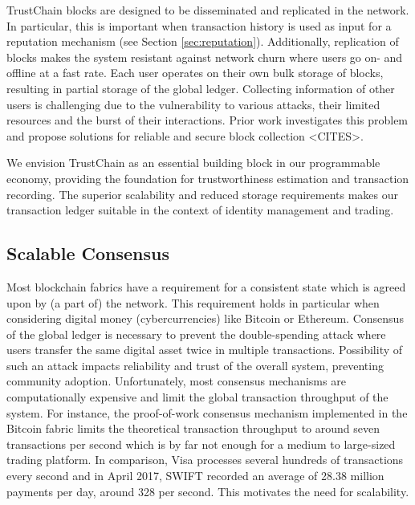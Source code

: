 \documentclass[USenglish]{article}
\begin{document}
TrustChain blocks are designed to be disseminated and replicated in the network.
In particular, this is important when transaction history is used as input for a reputation mechanism (see Section \ref{sec:reputation}).
Additionally, replication of blocks makes the system resistant against network churn where users go on- and offline at a fast rate.
Each user operates on their own bulk storage of blocks, resulting in partial storage of the global ledger.
Collecting information of other users is challenging due to the vulnerability to various attacks, their limited resources and the burst of their interactions.
Prior work investigates this problem and propose solutions for reliable and secure block collection <CITES>.

We envision TrustChain as an essential building block in our programmable economy, providing the foundation for trustworthiness estimation and transaction recording.
The superior scalability and reduced storage requirements makes our transaction ledger suitable in the context of identity management and trading.

\subsection{Scalable Consensus}
\label{sec:scalable_consensus}
Most blockchain fabrics have a requirement for a consistent state which is agreed upon by (a part of) the network.
This requirement holds in particular when considering digital money (cybercurrencies) like Bitcoin or Ethereum.
Consensus of the global ledger is necessary to prevent the double-spending attack where users transfer the same digital asset twice in multiple transactions.
Possibility of such an attack impacts reliability and trust of the overall system, preventing community adoption.
Unfortunately, most consensus mechanisms are computationally expensive and limit the global transaction throughput of the system.
For instance, the proof-of-work consensus mechanism implemented in the Bitcoin fabric limits the theoretical transaction throughput to around seven transactions per second which is by far not enough for a medium to large-sized trading platform.
In comparison, Visa processes several hundreds of transactions every second and in April 2017, SWIFT recorded an average of 28.38 million payments per day, around 328 per second.
This motivates the need for scalability.
\end{document}
